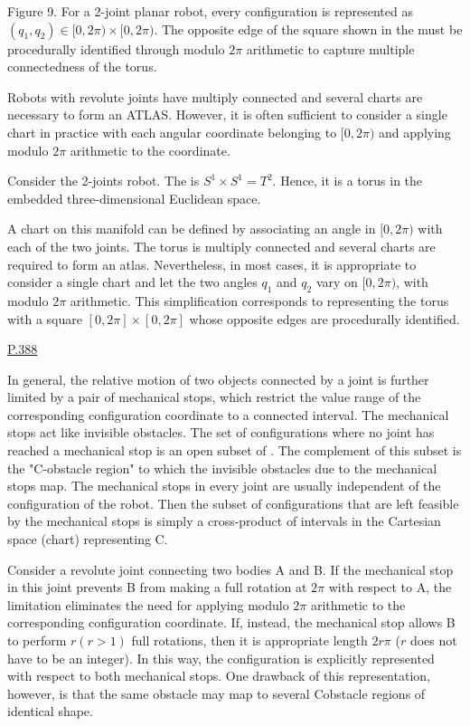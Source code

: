 Figure 9. For a 2-joint planar robot, every configuration is represented as $(q_1, q_2) \in [0,2\pi) \times [0,2\pi)$. The opposite edge of the square shown in the \cs must be procedurally identified through modulo $2\pi$ arithmetic to capture multiple connectedness of the torus.

Robots with revolute joints have multiply connected \cs and several charts are necessary to form an ATLAS. However, it is often sufficient to consider a single chart in practice with each angular coordinate belonging to $[0,2\pi)$ and applying modulo $2\pi$ arithmetic to the coordinate.

Consider the 2-joints robot. The \cs is $S^1 \times S^1 = T^2$. Hence, it is a torus in the embedded three-dimensional Euclidean space.

A chart on this manifold can be defined by associating an angle in $[0,2\pi)$ with each of the two joints. The torus is multiply connected and several charts are required to form an atlas. Nevertheless, in most cases, it is appropriate to consider a single chart and let the two angles $q_1$ and $q_2$ vary on $[0,2\pi)$, with modulo $2\pi$ arithmetic. This simplification corresponds to representing the torus with a square $[0,2\pi] \times [0,2\pi]$ whose opposite edges are procedurally identified.

\noindent \underline{P.388}

In general, the relative motion of two objects connected by a joint is further limited by a pair of mechanical stops, which restrict the value range of the corresponding configuration coordinate to a connected interval. The mechanical stops act like invisible obstacles. The set of configurations where no joint has reached a mechanical stop is an open subset of \cs. The complement of this subset is the "C-obstacle region" to which the invisible obstacles due to the mechanical stops map.
The mechanical stops in every joint are usually independent of the configuration of the robot. Then the subset of configurations that are left feasible by the mechanical stops is simply a cross-product of intervals in the Cartesian space (chart) representing C.

Consider a revolute joint connecting two bodies A and B. If the mechanical stop in this joint prevents B from making a full rotation at $2\pi$ with respect to A, the limitation eliminates the need for applying modulo $2\pi$ arithmetic to the corresponding configuration coordinate. If, instead, the mechanical stop allows B to perform $r (r> 1)$ full rotations, then it is appropriate length $2r\pi$ ($r$ does not have to be an integer). In this way, the configuration is explicitly represented with respect to both mechanical stops. One drawback of this representation, however, is that the same obstacle may map to several Cobstacle regions of identical shape.






